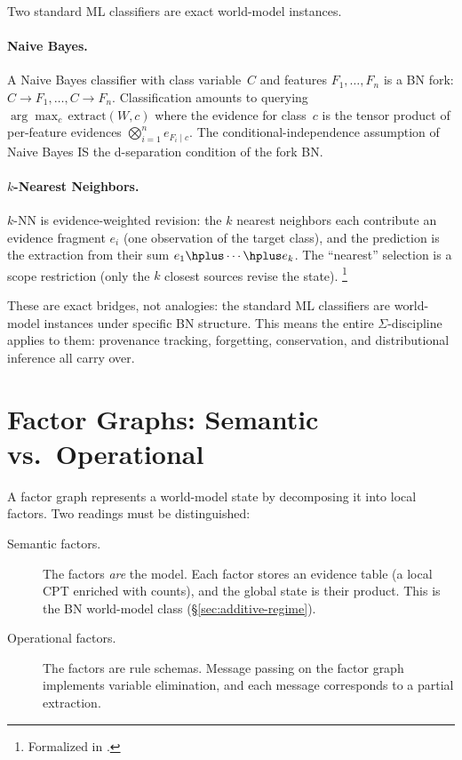 \documentclass[11pt,openany]{report}
\begin{document}
Two standard ML classifiers are exact world-model instances.

\paragraph{Naive Bayes.}
A Naive Bayes classifier with class variable~$C$ and features
$F_1, \ldots, F_n$ is a BN fork: $C \to F_1, \ldots, C \to F_n$.
Classification amounts to querying
$\arg\max_c \,\mathrm{extract}(W, c)$ where the evidence for class~$c$
is the tensor product of per-feature evidences
$\bigotimes_{i=1}^n e_{F_i \mid c}$.  The conditional-independence
assumption of Naive Bayes IS the d-separation condition of the fork BN.

\paragraph{$k$-Nearest Neighbors.}
$k$-NN is evidence-weighted revision: the $k$ nearest neighbors each
contribute an evidence fragment $e_i$ (one observation of the target
class), and the prediction is the extraction from their sum
$e_1 \hplus \cdots \hplus e_k$.  The ``nearest'' selection is a scope
restriction (only the $k$ closest sources revise the state).%
\footnote{Formalized in
.}

\noindent
These are exact bridges, not analogies: the standard ML classifiers
are world-model instances under specific BN structure.  This means
the entire $\Sigma$-discipline applies to them: provenance tracking,
forgetting, conservation, and distributional inference all carry
over.


\section{Factor Graphs: Semantic vs.\ Operational}

A factor graph represents a world-model state by decomposing it into
local factors.  Two readings must be distinguished:

\begin{description}
\item[Semantic factors.] The factors \emph{are} the model.  Each factor
  stores an evidence table (a local CPT enriched with counts), and the
  global state is their product.  This is the BN world-model class
  (\S\ref{sec:additive-regime}).

\item[Operational factors.] The factors are rule schemas.  Message
  passing on the factor graph implements variable elimination, and each
  message corresponds to a partial extraction.
\end{description}
\end{document}
